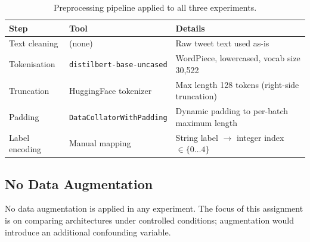 \begin{table}[H]
    \centering
    \caption{Preprocessing pipeline applied to all three experiments.}
    \label{tab:preprocessing}
    \begin{tabularx}{\textwidth}{l l X}
        \toprule
        \textbf{Step} & \textbf{Tool} & \textbf{Details} \\
        \midrule
        Text cleaning   & (none)                          & Raw tweet text used as-is \\
        Tokenisation    & \texttt{distilbert-base-uncased} & WordPiece, lowercased, vocab size 30,522 \\
        Truncation      & HuggingFace tokenizer           & Max length 128 tokens (right-side truncation) \\
        Padding         & \texttt{DataCollatorWithPadding}& Dynamic padding to per-batch maximum length \\
        Label encoding  & Manual mapping                  & String label $\to$ integer index $\in\{0\ldots4\}$ \\
        \bottomrule
    \end{tabularx}
\end{table}

\subsection{No Data Augmentation}

No data augmentation is applied in any experiment. The focus of this assignment is on comparing architectures under controlled conditions; augmentation would introduce an additional confounding variable.

